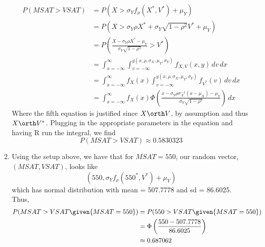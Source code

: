 \documentclass[12pt,titlepage]{article}\usepackage{graphicx, color}
\begin{document}
\begin{enumerate}
\begin{align*}
P(MSAT > VSAT) &= P( X > \sigma_{Y} f_{\rho}(X^{*},V^{*}) + \mu_{Y}) \\
&= P( X > \sigma_{Y}\rho X^{*} + \sigma_{Y} \sqrt{1-\rho^2} V^{*} + \mu_{Y}) \\
&= P\left(\frac{X - \sigma_{Y} \rho X^{*} - \mu_{Y}}{\sigma_{Y}\sqrt{1-\rho^2}} > V^{*}\right) \\
&= \int_{x=-\infty}^{\infty} \int_{v=-\infty}^{g(x,\rho,\sigma_{X},\mu_{Y},\sigma_{Y})} f_{X,V}(x,y) \, dv \, dx \\
&= \int_{x=-\infty}^{\infty} f_{X}(x) \int_{v=-\infty}^{g(x,\rho,\sigma_{X},\mu_{Y},\sigma_{Y})} f_{V^{*}}(v) \, dv \, dx \\
&= \int_{x=-\infty}^{\infty} f_{X}(x) \Phi\left(\frac{x - \sigma_{Y} \rho \sigma_{X}^{-1} (x-\mu_{X}) - \mu_{Y}}{\sigma_{Y}\sqrt{1-\rho^2}}\right) \, dx
\end{align*}
Where the fifth equation is justified since $X \orth V$, by assumption and thus $X \orth V^{*}$. Plugging in the appropriate parameters in the equation and having R run the integral, we find
\[
P(MSAT > VSAT) \approx 0.5830323
\]
\item Using the setup above, we have that for $MSAT = 550$, our random vector, $(MSAT,VSAT)$, looks like
\[
(550, \sigma_{Y}f_{\rho}(550^{*},V^{*}) + \mu_{Y}) 
\]
which has normal distribution with mean = 507.7778 and sd = 86.6025. Thus, 
\begin{align*}
P(MSAT > VSAT \given{MSAT=550}) &= P(550 > VSAT \given{MSAT=550}) \\
&= \Phi\left(\frac{550-507.7778}{86.6025}\right)\\
&\approx 0.687062
\end{align*}
\end{enumerate}
\end{document}
